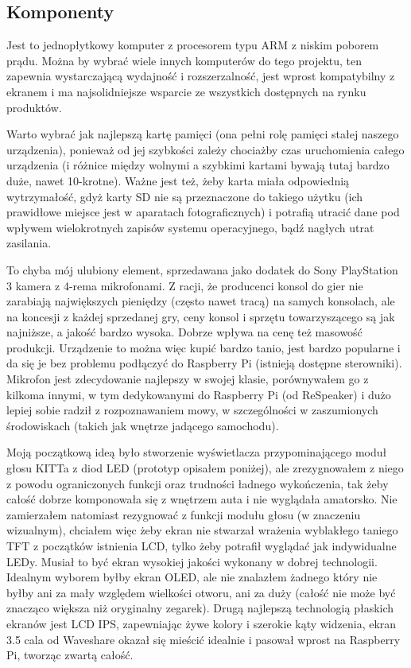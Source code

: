 \documentclass[declaration,shortabstract, inz]{iithesis}
\begin{document}
\subsection{Komponenty}
\begin{description}[style=nextline]
  \item[Raspberry Pi - model 4B w wersji 2Gb pamięci RAM]
    Jest to jednopłytkowy komputer z procesorem typu ARM z niskim poborem prądu.
    Można by wybrać wiele innych komputerów do tego projektu, ten zapewnia wystarczającą wydajność i rozszerzalność, jest wprost kompatybilny z ekranem i ma najsolidniejsze wsparcie ze wszystkich dostępnych na rynku produktów.
  \item[Karta microSD - SanDisk Extreme 32gb zgodny z UHS-1]
    Warto wybrać jak najlepszą kartę pamięci (ona pełni rolę pamięci stałej naszego urządzenia), ponieważ od jej szybkości zależy chociażby czas uruchomienia całego urządzenia (i różnice między wolnymi a szybkimi kartami bywają tutaj bardzo duże, nawet 10-krotne). Ważne jest też, żeby karta miała odpowiednią wytrzymałość, gdyż karty SD nie są przeznaczone do takiego użytku (ich prawidłowe miejsce jest w aparatach fotograficznych) i potrafią utracić dane pod wpływem wielokrotnych zapisów systemu operacyjnego, bądź nagłych utrat zasilania.
  \item[Kamera / mikrofon - Sony PlayStation Eye]
    To chyba mój ulubiony element, sprzedawana jako dodatek do Sony PlayStation 3 kamera z 4-rema mikrofonami. Z racji, że producenci konsol do gier nie zarabiają największych pieniędzy (często nawet tracą) na samych konsolach, ale na koncesji z każdej sprzedanej gry, ceny konsol i sprzętu towarzyszącego są jak najniższe, a jakość bardzo wysoka. Dobrze wpływa na cenę też masowość produkcji. Urządzenie to można więc kupić bardzo tanio, jest bardzo popularne i da się je bez problemu podłączyć do Raspberry Pi (istnieją dostępne sterowniki). Mikrofon jest zdecydowanie najlepszy w swojej klasie, porównywałem go z kilkoma innymi, w tym dedykowanymi do Raspberry Pi (od ReSpeaker) i dużo lepiej sobie radził z rozpoznawaniem mowy, w szczególności w zaszumionych środowiskach (takich jak wnętrze jadącego samochodu).
  \item[Ekran IPS 3.5'' - Waveshare 12824]
    Moją początkową ideą było stworzenie wyświetlacza przypominającego moduł głosu KITTa z diod LED (prototyp opisałem poniżej), ale zrezygnowałem z niego z powodu ograniczonych funkcji oraz trudności ładnego wykończenia, tak żeby całość dobrze komponowała się z wnętrzem auta i nie wyglądała amatorsko. Nie zamierzałem natomiast rezygnować z funkcji modułu głosu (w znaczeniu wizualnym), chciałem więc żeby ekran nie stwarzał wrażenia wyblakłego taniego TFT z początków istnienia LCD, tylko żeby potrafił wyglądać jak indywidualne LEDy. Musiał to być ekran wysokiej jakości wykonany w dobrej technologii. Idealnym wyborem byłby ekran OLED, ale nie znalazłem żadnego który nie byłby ani za mały względem wielkości otworu, ani za duży (całość nie może być znacząco większa niż oryginalny zegarek). Drugą najlepszą technologią płaskich ekranów jest LCD IPS, zapewniając żywe kolory i szerokie kąty widzenia, ekran 3.5 cala od Waveshare okazał się mieścić idealnie i pasował wprost na Raspberry Pi, tworząc zwartą całość.

\end{description}
\end{document}
